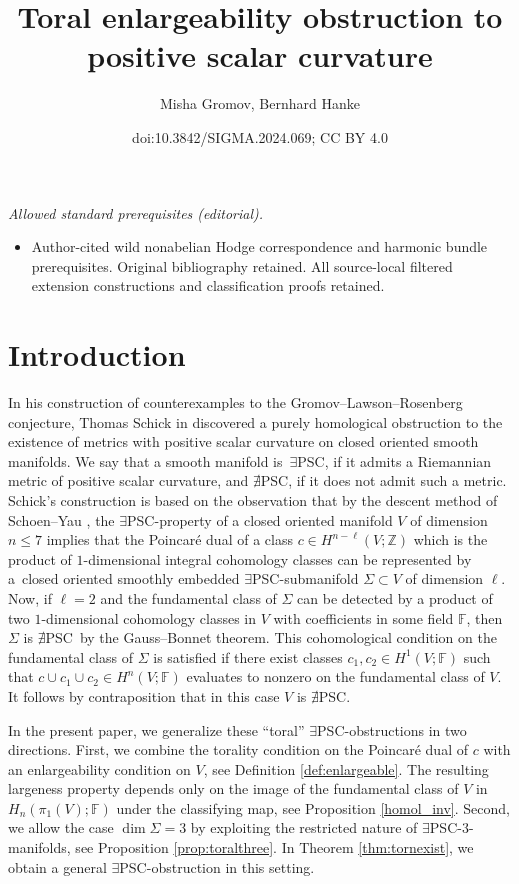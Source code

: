 \documentclass[10pt,a4paper]{amsart}
\title{Toral enlargeability obstruction to positive scalar curvature}
\author{Misha Gromov, Bernhard Hanke}
\date{doi:10.3842/SIGMA.2024.069; CC BY 4.0}
\numberwithin{equation}{section}
\newcommand{\F}{\mathbb{F}}
\newcommand{\Z}{\mathbb{Z}}
\newcommand{\no}{{\color{brown!70!black}$\nexists$}{\sf PSC}}
\newcommand{\yes}{{\color {blue!70!black}$\exists$}{\sf PSC}}
\begin{document}
\maketitle
\noindent\textit{Allowed standard prerequisites (editorial).}\begin{itemize}
\item Author-cited wild nonabelian Hodge correspondence and harmonic bundle prerequisites. Original bibliography retained. All source-local filtered extension constructions and classification proofs retained.
\end{itemize}\medskip
\section{Introduction}

In his construction of counterexamples to the Gromov--Lawson--Rosenberg conjecture, Thomas Schick in \cite{Sch98} discovered a purely homological obstruction to the existence of metrics with positive scalar curvature on closed oriented smooth manifolds.
We say that a smooth manifold is~\yes, if it admits a Riemannian metric of positive scalar curvature, and \no, if it does not admit such a metric.
Schick's construction is based on the observation that by the descent method of Schoen--Yau \cite{S-Y1979,SY}, the \yes-property of a closed oriented manifold $V$ of dimension~${n \leq 7}$ implies that the Poincar\'e dual of a class $c \in H^{n-\ell}(V; \Z)$ which is the product of $1$-dimensional integral cohomology classes can be represented by a~closed oriented smoothly embedded \yes-submanifold $\Sigma \subset V$ of dimension $\ell$.
Now, if $\ell = 2$ and the fundamental class of $\Sigma$ can be detected by a product of two $1$-dimensional cohomology classes in $V$ with coefficients in some field $\F$, then $\Sigma$ is \no~by the Gauss--Bonnet theorem.
This cohomological condition on the fundamental class of $\Sigma$ is satisfied if there exist classes $c_1, c_2 \in H^1(V; \F)$ such that $c \cup c_1 \cup c_2 \in H^n(V; \F)$ evaluates to nonzero on the fundamental class of $V$.
It follows by contraposition that in this case $V$ is \no.

In the present paper, we generalize these ``toral'' \yes-obstructions in two directions.
First, we combine the torality condition on the Poincar\'e dual of $c$ with an enlargeability condition on $V$, see Definition \ref{def:enlargeable}.
The resulting largeness property depends only on the image of the fundamental class of $V$ in $H_n( \pi_1(V) ; \F)$ under the classifying map, see Proposition \ref{homol_inv}.
Second, we allow the case $\dim \Sigma = 3$ by exploiting the restricted nature of \yes-$3$-manifolds, see Proposition \ref{prop:toralthree}.
In Theorem \ref{thm:tornexist}, we obtain a general \yes-obstruction in this setting.
\end{document}
